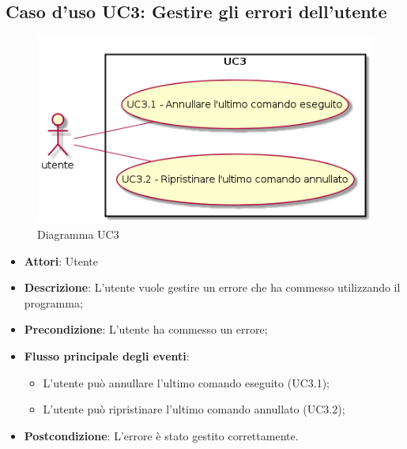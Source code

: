 \documentclass[../AnalisiDeiRequisiti.tex]{subfiles}
\begin{document}
					\subsection{Caso d'uso UC3: Gestire gli errori dell'utente}
					\begin{figure} [H]
						\centering
						\includegraphics[scale=0.45]{./Figures/UC3.png}
						\caption{Diagramma UC3}\label{}
					\end{figure}
					\begin{itemize}
						\item \textbf{Attori}: Utente
						\item \textbf{Descrizione}: L'utente vuole gestire un errore che ha commesso utilizzando il programma;
						\item \textbf{Precondizione}: L'utente ha commesso un errore;
						\item \textbf{Flusso principale degli eventi}: \begin{itemize}
							\item L'utente può annullare l'ultimo comando eseguito (UC3.1);
							\item L'utente può ripristinare l'ultimo comando annullato (UC3.2);
						\end{itemize}
						\item \textbf{Postcondizione}: L'errore è stato gestito correttamente.
					\end{itemize}
\end{document}
